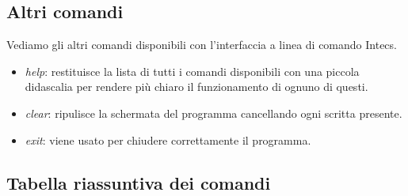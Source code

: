 \subsection{Altri comandi}
Vediamo gli altri comandi disponibili con l'interfaccia a linea di comando Intecs.
\begin{itemize}
    \item \textit{help}: restituisce la lista di tutti i comandi disponibili con una piccola didascalia per rendere più chiaro il funzionamento di ognuno di questi.
    \item \textit{clear}: ripulisce la schermata del programma cancellando ogni scritta presente.
    \item \textit{exit}: viene usato per chiudere correttamente il programma.
\end{itemize}

\subsection{Tabella riassuntiva dei comandi}



